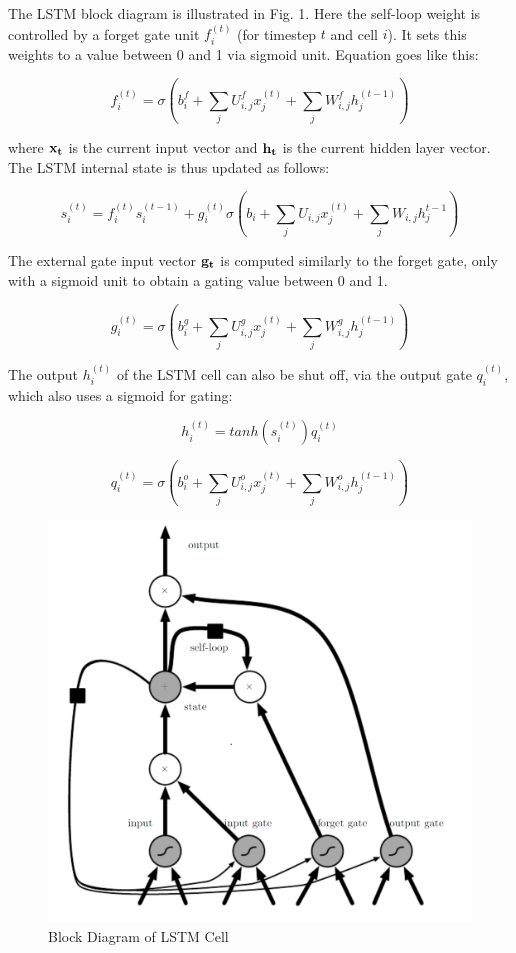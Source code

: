 \documentclass[10pt,a4paper]{article}
\begin{document}
\begin{spacing}{1.5}
The LSTM block diagram is illustrated in Fig. 1. Here the self-loop weight is controlled by a forget gate unit $f_i^{(t)}$ (for timestep $t$ and cell $i$). It sets this weights to a value between 0 and 1 via sigmoid unit. Equation goes like this:

\begin{equation}
f_i^{(t)} = \sigma (b_i^f + \sum_j U_{i,j}^f x_j^{(t)} + \sum_j W_{i,j}^f h_j^{(t-1)})
\end{equation}

where $\bf{x}_t$ is the current input vector and $\bf{h}_t$ is the current hidden layer vector. The LSTM internal state is thus updated as follows:

\begin{equation}
s_i^{(t)} = f_i^{(t)} s_i^{(t-1)}+ g_i^{(t)} \sigma ( b_i + \sum_j U_{i,j}x_j^{(t)}+ \sum_j W_{i,j} h_j^{t-1})
\end{equation}

The external gate input vector $\bf{g}_t$ is computed similarly to the forget gate, only with a sigmoid unit to obtain a gating value between 0 and 1.

\begin{equation}
g_i^{(t)} = \sigma (b_i^g + \sum_j U_{i,j}^g x_j^{(t)} + \sum_j W_{i,j}^g h_j ^{(t-1)})
\end{equation}

The output $h_i^{(t)}$ of the LSTM cell can also be shut off, via the output gate $q_i^{(t)}$, which also uses a sigmoid for gating:

\begin{equation}
h_i^{(t)} = tanh(s_i^{(t)})q_i^{(t)}
\end{equation}

\begin{equation}
q_i^{(t)} = \sigma (b_i^o + \sum_j U_{i,j}^o x_j^{(t)}+ \sum_j W_{i,j}^o h_j^{(t-1)})
\end{equation}

\begin{figure}[H]
	\centering
	\includegraphics[width = 10 cm]{pic/1.png}
	\caption{Block Diagram of LSTM Cell}
\end{figure}


\end{spacing}
\end{document}
